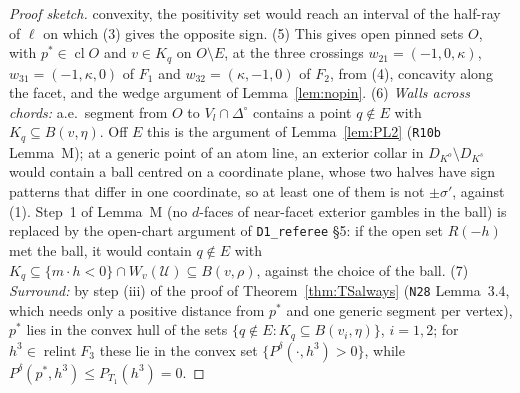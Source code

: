 \documentclass[11pt]{article}
\theoremstyle{definition}
\theoremstyle{remark}
\newcommand{\Di}{\Delta^{\circ}}
\newcommand{\cl}{\operatorname{cl}}
\newcommand{\relint}{\operatorname{relint}}
\newcommand{\src}[1]{\texttt{#1}}
\begin{document}
\begin{proof}[Proof sketch]
convexity, the positivity set would reach an interval of the half-ray of $\ell$ on which (3) gives the opposite sign. (5) This gives open pinned sets $O$, with $p^*\in\cl O$ and $v\in K_q$ on $O\setminus E$, at the three crossings $w_{21}=(-1,0,\kappa)$, $w_{31}=(-1,\kappa,0)$ of $F_1$ and $w_{32}=(\kappa,-1,0)$ of $F_2$, from (4), concavity along the facet, and the wedge argument of Lemma~\ref{lem:nopin}. (6) \emph{Walls across chords:} a.e.\ segment from $O$ to $V_l\cap\Di$ contains a point $q\notin E$ with $K_q\subseteq B(v,\eta)$. Off $E$ this is the argument of Lemma~\ref{lem:PL2} (\src{R10b} Lemma~M); at a generic point of an atom line, an exterior collar in $D_{K^o}\setminus D_{K^s}$ would contain a ball centred on a coordinate plane, whose two halves have sign patterns that differ in one coordinate, so at least one of them is not $\pm\sigma'$, against (1). Step~1 of Lemma~M (no $d$-faces of near-facet exterior gambles in the ball) is replaced by the open-chart argument of \src{D1\_referee} \S5: if the open set $R(-h)$ met the ball, it would contain $q\notin E$ with $K_q\subseteq\{m\cdot h<0\}\cap W_v(\mathcal U)\subseteq B(v,\rho)$, against the choice of the ball. (7) \emph{Surround:} by step (iii) of the proof of Theorem~\ref{thm:TSalways} (\src{N28} Lemma~3.4, which needs only a positive distance from $p^*$ and one generic segment per vertex), $p^*$ lies in the convex hull of the sets $\{q\notin E:K_q\subseteq B(v_i,\eta)\}$, $i=1,2$; for $h^3\in\relint F_3$ these lie in the convex set $\{P^\delta(\cdot,h^3)>0\}$, while $P^\delta(p^*,h^3)\le P_{T_1}(h^3)=0$.
\end{proof}
\end{document}
